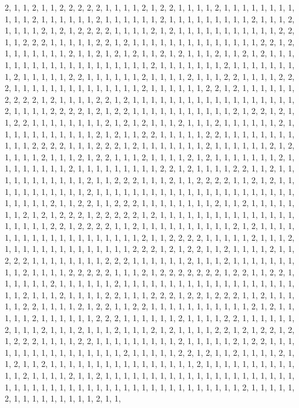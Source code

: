 \documentclass[
]{article}
\begin{document}
\begin{Schunk}
\begin{Soutput}
2, 1, 1, 2, 1, 1, 2, 2, 2, 2, 2, 1, 1, 1, 1, 2, 1, 2, 2, 1, 1, 1, 1, 2, 1, 1, 1, 1, 1, 1, 1, 1, 1, 1, 1, 2, 1, 1, 1, 1, 1, 1, 2, 1, 1, 1, 1, 1, 1, 2, 1, 1, 1, 1, 1, 1, 1, 1, 1, 2, 1, 1, 1, 2, 1, 1, 1, 1, 2, 1, 2, 1, 2, 2, 2, 2, 1, 1, 1, 1, 2, 1, 2, 1, 1, 1, 1, 1, 1, 1, 1, 1, 1, 1, 2, 2, 1, 1, 2, 2, 2, 1, 1, 1, 1, 1, 2, 2, 1, 2, 1, 1, 1, 1, 1, 1, 1, 1, 1, 1, 1, 1, 1, 1, 2, 2, 1, 2, 1, 1, 1, 1, 1, 1, 1, 2, 1, 1, 2, 1, 2, 1, 2, 1, 1, 2, 1, 2, 1, 1, 1, 2, 1, 1, 2, 1, 2, 1, 1, 1, 1, 1, 1, 1, 1, 1, 1, 1, 1, 1, 1, 1, 1, 1, 1, 1, 2, 1, 1, 1, 1, 1, 1, 1, 2, 1, 1, 1, 1, 1, 1, 1, 1, 2, 1, 1, 1, 1, 1, 2, 2, 1, 1, 1, 1, 1, 1, 2, 1, 1, 1, 1, 2, 1, 1, 1, 2, 2, 1, 1, 1, 1, 2, 2, 2, 1, 1, 1, 1, 1, 1, 1, 1, 1, 1, 1, 1, 1, 1, 2, 1, 1, 1, 1, 1, 1, 2, 2, 1, 2, 1, 1, 1, 1, 1, 1, 2, 2, 2, 2, 1, 2, 1, 1, 1, 1, 2, 2, 1, 2, 1, 1, 1, 1, 1, 1, 1, 1, 1, 1, 1, 1, 1, 1, 1, 1, 1, 1, 2, 1, 1, 1, 1, 2, 2, 2, 2, 1, 2, 1, 2, 2, 1, 1, 1, 1, 1, 1, 1, 1, 1, 1, 1, 2, 1, 2, 2, 1, 2, 1, 1, 2, 2, 1, 1, 1, 1, 1, 1, 1, 1, 2, 1, 2, 1, 2, 1, 1, 1, 2, 1, 1, 1, 2, 1, 1, 1, 1, 1, 1, 2, 1, 1, 1, 1, 1, 1, 1, 1, 1, 1, 1, 2, 1, 2, 1, 1, 2, 2, 1, 1, 1, 1, 1, 2, 2, 1, 1, 1, 1, 1, 1, 1, 1, 1, 1, 1, 2, 2, 2, 2, 1, 1, 1, 2, 2, 2, 1, 2, 1, 1, 1, 1, 1, 1, 1, 2, 1, 1, 1, 1, 1, 1, 2, 1, 2, 1, 1, 1, 1, 2, 1, 1, 1, 2, 1, 2, 2, 1, 1, 1, 2, 1, 1, 1, 1, 2, 1, 2, 1, 1, 1, 1, 1, 1, 1, 2, 1, 1, 1, 1, 1, 1, 1, 1, 2, 1, 1, 1, 1, 1, 1, 1, 1, 1, 2, 2, 1, 2, 1, 1, 1, 1, 2, 2, 1, 1, 2, 1, 1, 1, 1, 1, 1, 1, 1, 1, 1, 1, 2, 1, 1, 2, 2, 2, 1, 1, 1, 2, 1, 1, 2, 2, 2, 2, 1, 1, 2, 1, 2, 1, 1, 1, 1, 1, 1, 1, 1, 1, 1, 1, 2, 1, 1, 1, 1, 1, 1, 1, 1, 1, 1, 1, 1, 1, 1, 1, 1, 1, 1, 1, 1, 1, 1, 1, 1, 1, 1, 1, 2, 1, 1, 2, 2, 1, 1, 2, 2, 2, 1, 1, 1, 1, 1, 1, 1, 1, 2, 1, 1, 2, 1, 1, 1, 1, 1, 1, 1, 2, 1, 2, 1, 2, 2, 2, 1, 2, 2, 2, 2, 2, 1, 2, 1, 1, 1, 1, 1, 1, 1, 1, 1, 1, 1, 1, 1, 1, 1, 1, 1, 1, 1, 1, 2, 2, 1, 2, 2, 2, 2, 1, 1, 2, 1, 1, 1, 1, 1, 1, 1, 1, 1, 1, 2, 1, 2, 1, 1, 1, 1, 1, 1, 1, 1, 1, 1, 1, 1, 1, 1, 1, 1, 1, 1, 1, 2, 1, 1, 2, 2, 2, 2, 1, 1, 1, 1, 1, 2, 1, 1, 1, 2, 1, 1, 1, 1, 1, 1, 1, 1, 1, 1, 1, 1, 1, 1, 2, 2, 2, 1, 2, 1, 2, 2, 1, 1, 2, 1, 1, 1, 1, 2, 1, 1, 2, 2, 2, 1, 1, 1, 1, 1, 1, 1, 1, 2, 2, 2, 1, 1, 1, 1, 1, 1, 2, 1, 1, 1, 2, 1, 1, 1, 1, 1, 1, 1, 1, 1, 2, 1, 1, 1, 1, 2, 2, 2, 2, 2, 1, 1, 1, 2, 1, 2, 2, 2, 2, 2, 2, 2, 1, 2, 2, 1, 1, 2, 2, 1, 1, 1, 1, 1, 1, 2, 1, 1, 1, 1, 1, 1, 2, 1, 1, 1, 1, 1, 1, 1, 1, 1, 1, 1, 1, 1, 1, 1, 1, 1, 1, 1, 1, 1, 2, 1, 1, 1, 2, 1, 1, 1, 1, 2, 2, 1, 1, 1, 2, 2, 2, 1, 2, 2, 1, 2, 2, 2, 1, 1, 2, 1, 1, 1, 1, 1, 2, 2, 1, 1, 1, 1, 2, 1, 2, 2, 1, 1, 2, 2, 1, 1, 1, 1, 1, 1, 1, 1, 1, 1, 1, 2, 1, 2, 1, 1, 1, 1, 1, 2, 1, 1, 1, 1, 1, 1, 2, 2, 2, 1, 1, 1, 1, 1, 1, 2, 1, 1, 1, 1, 2, 2, 1, 1, 1, 1, 1, 1, 2, 1, 1, 1, 2, 1, 1, 1, 2, 1, 1, 1, 2, 1, 1, 1, 2, 1, 2, 1, 1, 1, 1, 2, 2, 1, 2, 1, 2, 2, 1, 2, 1, 2, 2, 2, 1, 1, 1, 1, 2, 2, 1, 1, 1, 1, 1, 1, 1, 1, 1, 2, 1, 1, 1, 1, 1, 2, 1, 2, 2, 1, 1, 1, 1, 1, 1, 1, 1, 1, 1, 1, 1, 1, 1, 1, 1, 2, 1, 1, 1, 1, 1, 2, 2, 1, 2, 1, 1, 2, 1, 1, 1, 1, 2, 1, 1, 2, 1, 1, 2, 1, 1, 1, 1, 1, 1, 1, 1, 1, 1, 1, 1, 1, 1, 1, 1, 2, 1, 1, 1, 1, 1, 1, 1, 1, 1, 1, 1, 1, 2, 1, 1, 1, 1, 2, 1, 1, 2, 1, 1, 1, 1, 1, 1, 1, 1, 1, 1, 1, 1, 1, 1, 1, 1, 1, 1, 1, 1, 1, 1, 1, 1, 1, 1, 1, 1, 1, 1, 1, 1, 1, 1, 1, 1, 1, 1, 1, 1, 1, 1, 1, 1, 1, 1, 1, 2, 1, 1, 1, 1, 1, 2, 1, 1, 1, 1, 1, 1, 1, 1, 1, 2, 1, 1, 
\end{Soutput}
\end{Schunk}
\end{document}
